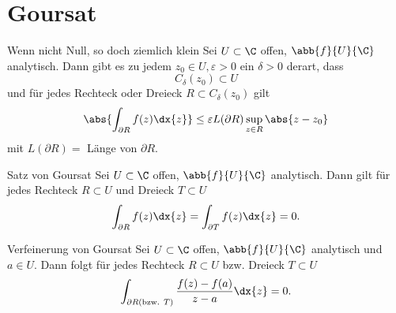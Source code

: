 \section{Goursat}

\begin{karte}{Wenn nicht Null, so doch ziemlich klein}
    Sei \(U \subset \C\) offen, \(\abb{f}{U}{\C}\) analytisch. Dann gibt es zu jedem \(z_0 \in U, \varepsilon > 0\) 
    ein \(\delta > 0\) derart, dass 
    \[ C_\delta(z_0) \subset U \]
    und für jedes Rechteck oder Dreieck \(R \subset C_\delta(z_0)\) gilt 
    \[ \abs{ \int_{\partial R} f(z) \dx{z} } \leq \varepsilon L(\partial R) \sup_{z\in R} \abs{z - z_0} \]
    mit \(L(\partial R) = \) Länge von \(\partial R\).
\end{karte}

\begin{karte}{Satz von Goursat}
    Sei \(U \subset \C\) offen, \(\abb{f}{U}{\C}\) analytisch. Dann gilt für jedes Rechteck \(R \subset U\) 
    und Dreieck \(T \subset U\)
    \[ \int_{\partial R} f(z) \dx{z} = \int_{\partial T} f(z) \dx{z} = 0. \]
\end{karte}

\begin{karte}{Verfeinerung von Goursat}
    Sei \(U \subset \C\) offen, \(\abb{f}{U}{\C}\) analytisch und \(a\in U\). 
    Dann folgt für jedes Rechteck \(R\subset U\) bzw. Dreieck \(T \subset U\)
    \[ \int_{\partial R \text{(bzw. \(T\))}} \frac{f(z) - f(a)}{z - a} \dx{z} = 0. \]
\end{karte}